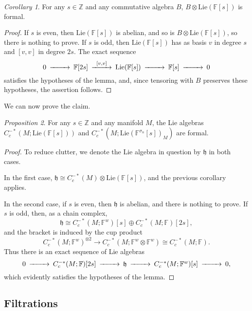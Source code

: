 \documentclass{compositio}
\theoremstyle{definition}\newtheorem{definition}{Definition}[section]
\theoremstyle{theorem}\newtheorem{lemma}[definition]{Lemma}
\theoremstyle{remark}\newtheorem*{conventions}{Conventions}
\theoremstyle{remark}\newtheorem*{acknowledgments}{Acknowledgments}
\theoremstyle{remark}\newtheorem*{outline}{Outline}
\theoremstyle{remark}\newtheorem*{questions}{Questions}
\theoremstyle{remark}\newtheorem{example}[definition]{Example}
\theoremstyle{definition}\newtheorem{construction}[definition]{Construction}
\theoremstyle{definition}\newtheorem*{convention}{Convention}
\theoremstyle{definition}\newtheorem*{conjecture}{Conjecture}
\theoremstyle{theorem}\newtheorem{theorem}[definition]{Theorem}
\theoremstyle{theorem}\newtheorem{paradigm}[definition]{Paradigm}
\theoremstyle{remark}\newtheorem{remark}[definition]{Remark}
\theoremstyle{corollary}\newtheorem{corollary}[definition]{Corollary}
\theoremstyle{theorem}\newtheorem{proposition}[definition]{Proposition}
\theoremstyle{definition}\newtheorem{question}[definition]{Question}
\begin{document}
\begin{corollary}\label{lemma}
For any $s\in\mathbb{Z}$ and any commutative algebra $B$, $B\otimes\mathrm{Lie}(\mathbb{F}[s])$ is formal.
\end{corollary}
\begin{proof}
If $s$ is even, then $\mathrm{Lie}(\mathbb{F}[s])$ is abelian, and so is $B\otimes\mathrm{Lie}(\mathbb{F}[s])$, so there is nothing to prove. If $s$ is odd, then $\mathrm{Lie}(\mathbb{F}[s])$ has as basis $v$ in degree $s$ and $[v,v]$ in degree $2s$. The exact sequence $$\begin{CD}0@>>>\mathbb{F}[2s]@>[v,v]>>\mathrm{Lie}(\mathbb{F}[s])@>>>\mathbb{F}[s]@>>>0\end{CD}$$ satisfies the hypotheses of the lemma, and, since tensoring with $B$ preserves these hypotheses, the assertion follows.
\end{proof}

We can now prove the claim.

\begin{proposition}
For any $s\in\mathbb{Z}$ and any manifold $M$, the Lie algebras $C_c^{-*}(M;{\mathrm{Lie}}(\mathbb{F}[s]))$ and $C_c^{-*}(M;{\mathrm{Lie}}(\mathbb{F}^{\sigma_n}[s])_M)$ are formal.
\end{proposition}
\begin{proof} To reduce clutter, we denote the Lie algebra in question by $\mathfrak{h}$ in both cases.

In the first case, $\mathfrak{h}\cong C_c^{-*}(M)\otimes{\mathrm{Lie}}(\mathbb{F}[s])$, and the previous corollary applies.

In the second case, if $s$ is even, then $\mathfrak{h}$ is abelian, and there is nothing to prove. If $s$ is odd, then, as a chain complex, $$\mathfrak{h}\cong C_c^{-*}(M;\mathbb{F}^w)[s]\oplus C_c^{-*}(M;\mathbb{F})[2s],$$ and the bracket is induced by the cup product $$C_c^{-*}(M;\mathbb{F}^w)^{\otimes 2}\to C_c^{-*}(M;\mathbb{F}^w\otimes\mathbb{F}^w)\cong C_c^{-*}(M;\mathbb{F}).$$ Thus there is an exact sequence of Lie algebras $$\begin{CD}0@>>> C_c^{-*}(M;\mathbb{F})[2s]@>>>\mathfrak{h} @>>> C_c^{-*}(M;\mathbb{F}^w)[s]@>>>0,\end{CD}$$ which evidently satisfies the hypotheses of the lemma.
\end{proof}

\subsection{Filtrations}\label{proof two}
\end{document}
